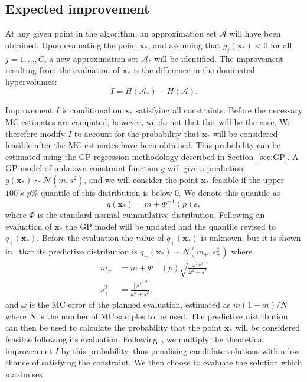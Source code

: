 \documentclass{article} %
\begin{document}
\subsection{Expected improvement}\label{sec:EGO}

At any given point in the algorithm, an approximation set $\mathcal{A}$ will have been obtained. Upon evaluating the point $\mathbf{x}_{*}$, and assuming that $g_{j}(\mathbf{x}_{*}) < 0$ for all $j = 1, \ldots , C$, a new approximation set $\mathcal{A}_{*}$ will be identified. The improvement resulting from the evaluation of $\mathbf{x}_{*}$ is the difference in the dominated hypervolumes:
\begin{equation}
I = H(\mathcal{A}_{*}) - H(\mathcal{A}).
\end{equation}

Improvement $I$ is conditional on $\mathbf{x}_{*}$ satisfying all constraints. Before the necessary MC estimates are computed, however, we do not that this will be the case. We therefore modify $I$ to account for the probability that $\mathbf{x}_{*}$ will be considered feasible after the MC estimates have been obtained. This probability can be estimated using the GP regression methodology described in Section~\ref{sec:GP}. A GP model of unknown constraint function $g$ will give a prediction $g(\mathbf{x}_{*}) \sim \mathcal{N}(m, s^{2})$, and we will consider the point $\mathbf{x}_{*}$ feasible if the upper $100 \times p$\% quantile of this distribution is below 0. We denote this quantile as
\begin{equation}\label{eqn:quant}
q(\mathbf{x}_{*}) = m + \Phi^{-1}(p)s,
\end{equation}
where $\Phi$ is the standard normal cummulative distribution. Following an evaluation of $\mathbf{x}_{*}$ the GP model will be updated and the quantile revised to $q_{+}(\mathbf{x}_{*})$. Before the evaluation the value of $q_{+}(\mathbf{x}_{*})$ is unknown, but it is shown in~\cite{Picheny2014} that its predictive distribution is $q_{+}(\mathbf{x}_{*}) \sim N(m_{+}, s_{+}^{2})$ where
\begin{align}
m_{+} &= m + \Phi^{-1}(p)\sqrt{\frac{\omega^{2}s^{2}}{\omega^{2} + s^{2}}} \\
s_{+}^{2} &= \frac{[s^{2}]^{2}}{\omega^{2} + s^{2}},
\end{align}
and $\omega$ is the MC error of the planned evaluation, estimated as $m(1-m)/N$ where $N$ is the number of MC samples to be used. The predictive distribution can then be used to calculate the probability that the point $\mathbf{x}_{*}$ will be considered feasible following its evaluation. Following~\cite{Sasena2002}, we multiply the theoretical improvement $I$ by this probability, thus penalising candidate solutions with a low chance of satisfying the constraint. We then choose to evaluate the solution which maximises
\end{document}
